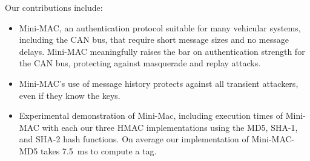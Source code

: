 Our contributions include:
\begin{itemize}

\item Mini-MAC, an authentication protocol suitable for many vehicular systems, including the CAN bus, 
that require short message sizes and no message delays.
Mini-MAC meaningfully raises the bar on authentication strength for the CAN bus, protecting against
masquerade and replay attacks.

\item Mini-MAC's use of message history protects against all transient attackers, 
even if they know the keys.

\item Experimental demonstration of Mini-Mac, including execution times of Mini-MAC 
with each our three HMAC implementations using the MD5, SHA-1, and SHA-2 hash functions. 
On average our implementation of Mini-MAC-MD5 takes 7.5~ms to compute a tag.

\end{itemize}
